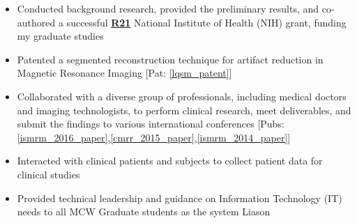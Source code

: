 \begin{minipage}{\textwidth}
	\begin{itemize}
	\item Conducted background research, provided the preliminary results, and co-authored a successful \href{https://grants.nih.gov/grants/funding/r21.htm}{\textbf{R21}} National Institute of Health (NIH) grant, funding my graduate studies\none
   	\item Patented a segmented reconstruction technique for artifact reduction in Magnetic Resonance Imaging [Pat: \ref{lqsm_patent}]\none
	\item Collaborated with a diverse group of professionals, including medical doctors and imaging technologists, to perform clinical research, meet deliverables, and submit the findings to various international conferences [Pubs: \ref{ismrm_2016_paper},\ref{cmrr_2015_paper},\ref{ismrm_2014_paper}]\none
	\item Interacted with clinical patients and subjects to collect patient data for clinical studies
	\item Provided technical leadership and guidance on Information Technology (IT) needs to all MCW Graduate students as the system Liason\ntwo
	\end{itemize}
\end{minipage}

